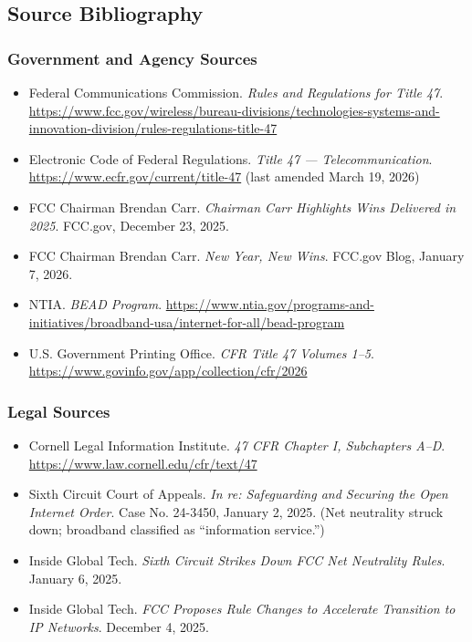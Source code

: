 \documentclass[11pt,letterpaper]{article}
\begin{document}
\subsection{Source Bibliography}

\subsubsection{Government and Agency Sources}

\begin{itemize}[leftmargin=1.5em]
  \item Federal Communications Commission. \textit{Rules and Regulations for Title 47}. \url{https://www.fcc.gov/wireless/bureau-divisions/technologies-systems-and-innovation-division/rules-regulations-title-47}
  \item Electronic Code of Federal Regulations. \textit{Title 47 --- Telecommunication}. \url{https://www.ecfr.gov/current/title-47} (last amended March 19, 2026)
  \item FCC Chairman Brendan Carr. \textit{Chairman Carr Highlights Wins Delivered in 2025}. FCC.gov, December 23, 2025.
  \item FCC Chairman Brendan Carr. \textit{New Year, New Wins}. FCC.gov Blog, January 7, 2026.
  \item NTIA. \textit{BEAD Program}. \url{https://www.ntia.gov/programs-and-initiatives/broadband-usa/internet-for-all/bead-program}
  \item U.S. Government Printing Office. \textit{CFR Title 47 Volumes 1--5}. \url{https://www.govinfo.gov/app/collection/cfr/2026}
\end{itemize}

\subsubsection{Legal Sources}

\begin{itemize}[leftmargin=1.5em]
  \item Cornell Legal Information Institute. \textit{47 CFR Chapter I, Subchapters A--D}. \url{https://www.law.cornell.edu/cfr/text/47}
  \item Sixth Circuit Court of Appeals. \textit{In re: Safeguarding and Securing the Open Internet Order}. Case No. 24-3450, January 2, 2025. (Net neutrality struck down; broadband classified as ``information service.'')
  \item Inside Global Tech. \textit{Sixth Circuit Strikes Down FCC Net Neutrality Rules}. January 6, 2025.
  \item Inside Global Tech. \textit{FCC Proposes Rule Changes to Accelerate Transition to IP Networks}. December 4, 2025.
\end{itemize}
\end{document}
